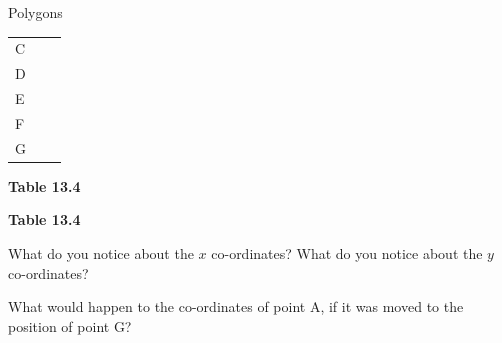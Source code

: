 \begin{exercises}{Polygons}
\begin{table}[H]
\begin{center}
\begin{xtabular}[t]{|l|l|l|}
    
        C &
    
    
         &
    
    
     \tabularnewline{}
    
    
        D &
    
    
         &
    
    
     \tabularnewline{}
    
    
        E &
    
    
         &
    
    
     \tabularnewline{}
    
    
        F &
    
    
         &
    
    
     \tabularnewline{}
    
    
        G &
    
    
         &
    
    
     \tabularnewline{}
    \end{xtabular}
      \end{center}
    \begin{center}{\small\bfseries Table 13.4}\end{center}
    \begin{caption}{\small\bfseries Table 13.4}\end{caption}
\end{table}
      
    \par
  
        
        \label{m39358*id70923}What do you notice about the $x$ co-ordinates? What do you notice about the $y$ co-ordinates?\par 
        \label{m39358*id70945}What would happen to the co-ordinates of point A, if it was moved to the position of point G?
 \par 


\end{exercises}
